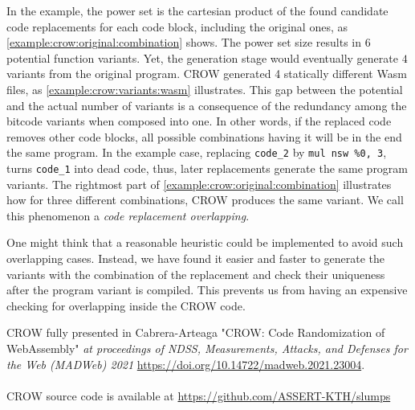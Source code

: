 In the example, the power set is the cartesian product of the found candidate code replacements for each code block, including the original ones, as \autoref{example:crow:original:combination} shows. The power set size results in $6$ potential function variants. Yet, the generation stage would eventually generate $4$ variants from the original program. CROW generated 4 statically different Wasm  files, as \autoref{example:crow:variants:wasm} illustrates. This gap between the potential and the actual number of variants is a consequence of the redundancy among the bitcode variants when composed into one. In other words, if the replaced code removes other code blocks, all possible combinations having it will be in the end the same program. In the example case, replacing \texttt{code\_2} by \texttt{mul nsw \%0, 3}, turns \texttt{code\_1} into dead code, thus, later replacements generate the same program variants. The rightmost part of \autoref{example:crow:original:combination} illustrates how for three different combinations, CROW produces the same variant. We call this phenomenon a \emph{code replacement overlapping}.



One might think that a reasonable heuristic could be implemented to avoid such overlapping cases. Instead, we have found it easier and faster to generate the variants with the combination of the replacement and check their uniqueness after the program variant is compiled. This prevents us from having an expensive checking for overlapping inside the CROW code.  


\begin{tcolorbox}[title=Contribution paper and artifact,boxrule=1pt,arc=.2em,boxsep=1.0mm]
   CROW fully presented in Cabrera-Arteaga \etal "CROW: Code Randomization of WebAssembly"
    \emph{at proceedings of NDSS, Measurements, Attacks, and Defenses for the Web (MADWeb) 2021}
    \url{https://doi.org/10.14722/madweb.2021.23004}.
    \\\\
    CROW source code is available at \url{https://github.com/ASSERT-KTH/slumps}

\end{tcolorbox}

